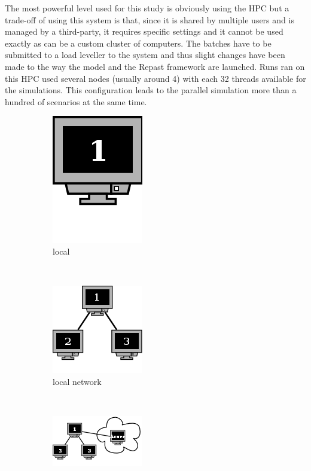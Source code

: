 \documentclass[a4paper,12pt]{report}
\begin{document}
The most powerful level used for this study is obviously using the HPC but a trade-off of using this system is that, since it is shared by multiple users and is managed by a third-party, it requires specific settings and it cannot be used exactly as can be a custom cluster of computers. The batches have to be submitted to a load leveller to the system and thus slight changes have been made to the way the model and the Repast framework are launched. Runs ran on this HPC used several nodes (usually around 4) with each 32 threads available for the simulations. This configuration leads to the parallel simulation more than a hundred of scenarios at the same time.

\begin{figure}
	\centering
	\begin{subfigure}[t]{0.48\textwidth}
		\centering
		\includegraphics[scale=0.6]{../data/network:local.png}
		\caption{local}
		\label{network:local}
	\end{subfigure}
	~
	\begin{subfigure}[t]{0.48\textwidth}
		\centering
		\includegraphics[scale=0.6]{../data/network:office.png}
		\caption{local network}
		\label{network:office}
	\end{subfigure}
	\\
	\begin{subfigure}[t]{0.48\textwidth}
		\centering
		\includegraphics[scale=1]{../data/network:azure.png}

\end{subfigure}
\end{figure}
\end{document}
